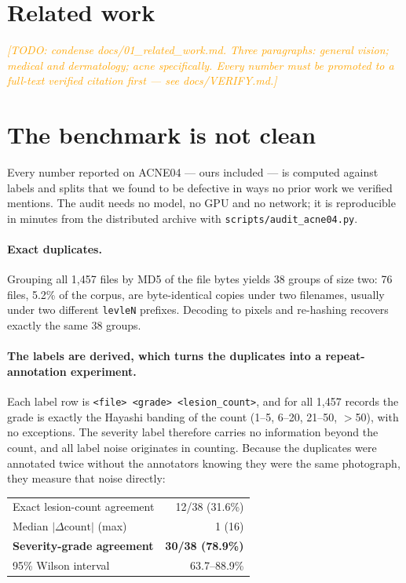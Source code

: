 \documentclass[11pt]{article}
\newcommand{\TODO}[1]{\textcolor{orange}{\textit{[TODO: #1]}}}
\begin{document}
\section{Related work}
\label{sec:related}
\TODO{condense docs/01\_related\_work.md. Three paragraphs: general vision; medical
and dermatology; acne specifically. Every number must be promoted to a full-text
verified citation first --- see docs/VERIFY.md.}

\section{The benchmark is not clean}
\label{sec:audit}

Every number reported on ACNE04 --- ours included --- is computed against labels and
splits that we found to be defective in ways no prior work we verified mentions. The
audit needs no model, no GPU and no network; it is reproducible in minutes from the
distributed archive with \texttt{scripts/audit\_acne04.py}.

\paragraph{Exact duplicates.}
Grouping all 1{,}457 files by MD5 of the file bytes yields 38 groups of size two:
76 files, 5.2\% of the corpus, are byte-identical copies under two filenames, usually
under two different \texttt{levleN} prefixes. Decoding to pixels and re-hashing
recovers exactly the same 38 groups.

\paragraph{The labels are derived, which turns the duplicates into a repeat-annotation
experiment.}
Each label row is \texttt{<file> <grade> <lesion\_count>}, and for all 1{,}457 records
the grade is exactly the Hayashi banding of the count (1--5, 6--20, 21--50, $>$50),
with no exceptions. The severity label therefore carries no information beyond the
count, and all label noise originates in counting. Because the duplicates were
annotated twice without the annotators knowing they were the same photograph, they
measure that noise directly:

\begin{center}
\begin{tabular}{lr}
\toprule
Exact lesion-count agreement & 12/38 \quad (31.6\%) \\
Median $|\Delta\text{count}|$ (max) & 1 \quad (16) \\
\textbf{Severity-grade agreement} & \textbf{30/38 \quad (78.9\%)} \\
95\% Wilson interval & 63.7--88.9\% \\
\bottomrule
\end{tabular}
\end{center}
\end{document}
